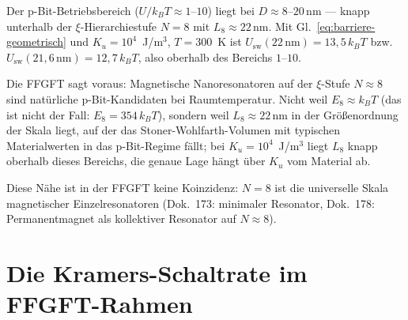 	\begin{center}
	\end{center}
	
	Der p-Bit-Betriebsbereich ($U/k_BT \approx 1$--$10$) liegt bei
	$D \approx 8$--$20\,\text{nm}$ --- knapp unterhalb der
	$\xi$-Hierarchiestufe $N = 8$ mit $L_8 \approx 22\,\text{nm}$.
	Mit Gl.~\eqref{eq:barriere-geometrisch} und $K_u = 10^4$~J/m$^3$, $T = 300$~K ist
	$U_\text{sw}(22\,\text{nm}) = 13{,}5\,k_BT$ bzw.\ $U_\text{sw}(21{,}6\,\text{nm}) = 12{,}7\,k_BT$,
	also oberhalb des Bereichs $1$--$10$.
	
	\begin{foundation}[Geometrische Vorhersage: $N=8$ als natürlicher p-Bit-Anker]
		Die FFGFT sagt voraus: Magnetische Nanoresonatoren auf der
		$\xi$-Stufe $N \approx 8$ sind natürliche p-Bit-Kandidaten bei
		Raumtemperatur. Nicht weil $E_8 \approx k_BT$ (das ist nicht der Fall:
		$E_8 = 354\,k_BT$), sondern weil $L_8 \approx 22\,\text{nm}$ in der
		Größenordnung der Skala liegt, auf der das Stoner-Wohlfarth-Volumen mit
		typischen Materialwerten in das p-Bit-Regime fällt; bei
		$K_u = 10^4$~J/m$^3$ liegt $L_8$ knapp oberhalb dieses Bereichs, die genaue
		Lage hängt über $K_u$ vom Material ab.
		
		Diese Nähe ist in der FFGFT keine Koinzidenz:
		$N=8$ ist die universelle Skala magnetischer Einzelresonatoren
		(Dok.~173: minimaler Resonator, Dok.~178: Permanentmagnet als
		kollektiver Resonator auf $N\approx8$).
	\end{foundation}
	
	\section{Die Kramers-Schaltrate im FFGFT-Rahmen}
	\label{sec:kramers}
	
